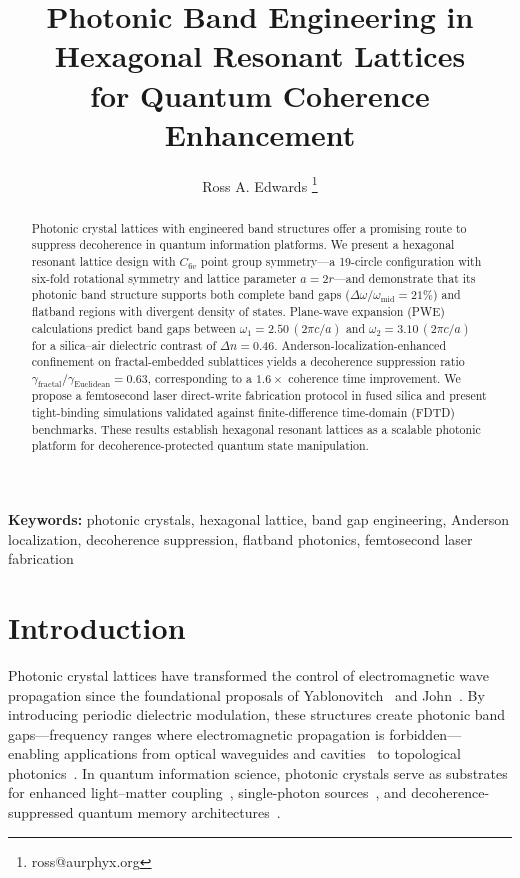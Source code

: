 \documentclass[10pt,letterpaper]{article}
\title{Photonic Band Engineering in Hexagonal Resonant Lattices\\
for Quantum Coherence Enhancement}
\author[1]{Ross A. Edwards \orcidlink{0009-0008-0539-1289}\thanks{ross@aurphyx.org}}
\affil[1]{Aurphyx LLC}
\date{}
\begin{document}
\begin{abstract}
Photonic crystal lattices with engineered band structures offer a promising route to suppress decoherence in quantum information platforms. We present a hexagonal resonant lattice design with $C_{6v}$ point group symmetry---a 19-circle configuration with six-fold rotational symmetry and lattice parameter $a = 2r$---and demonstrate that its photonic band structure supports both complete band gaps ($\Delta\omega/\omega_\mathrm{mid} = 21\%$) and flatband regions with divergent density of states. Plane-wave expansion (PWE) calculations predict band gaps between $\omega_1 = 2.50\,(2\pi c/a)$ and $\omega_2 = 3.10\,(2\pi c/a)$ for a silica--air dielectric contrast of $\Delta n = 0.46$. Anderson-localization-enhanced confinement on fractal-embedded sublattices yields a decoherence suppression ratio $\gamma_\mathrm{fractal}/\gamma_\mathrm{Euclidean} = 0.63$, corresponding to a $1.6\times$ coherence time improvement. We propose a femtosecond laser direct-write fabrication protocol in fused silica and present tight-binding simulations validated against finite-difference time-domain (FDTD) benchmarks. These results establish hexagonal resonant lattices as a scalable photonic platform for decoherence-protected quantum state manipulation.
\end{abstract}

\maketitle

\noindent\textbf{Keywords:} photonic crystals, hexagonal lattice, band gap engineering, Anderson localization, decoherence suppression, flatband photonics, femtosecond laser fabrication


\section{Introduction}
\label{sec:introduction}

Photonic crystal lattices have transformed the control of electromagnetic wave propagation since the foundational proposals of Yablonovitch~\cite{Yablonovitch1987} and John~\cite{John1987}. By introducing periodic dielectric modulation, these structures create photonic band gaps---frequency ranges where electromagnetic propagation is forbidden---enabling applications from optical waveguides and cavities~\cite{Joannopoulos2008} to topological photonics~\cite{Ozawa2019,Haldane2008}. In quantum information science, photonic crystals serve as substrates for enhanced light--matter coupling~\cite{Aspuru2012}, single-photon sources~\cite{Aharonovich2016}, and decoherence-suppressed quantum memory architectures~\cite{Childress2006}.
\end{document}
